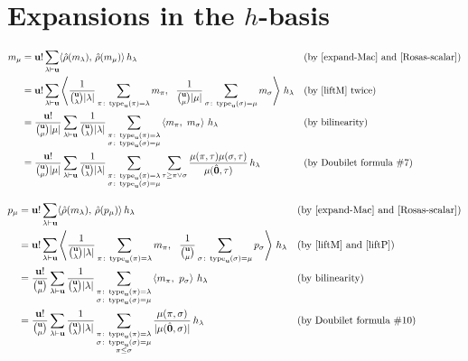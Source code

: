 \section{Expansions in the $h$-basis}

\begin{align*}
m_\mu &=  \mathbf{u}! \sum_{\lambda\vdash\mathbf{u}} \langle \hat\rho(m_\lambda),\,\hat\rho(m_\mu)\rangle\, h_\lambda
	&&\text{(by~\eqref{expand-Mac} and~\eqref{Rosas-scalar})}\\
&= \mathbf{u}! \sum_{\lambda\vdash\mathbf{u}} \left\langle \frac{1}{\binom{\mathbf{u}}{\lambda}|\lambda|} \sum_{\pi\colon \operatorname{type}_{\mathbf{u}}(\pi)=\lambda} m_\pi, \ \ \frac{1}{\binom{\mathbf{u}}{\mu}|\mu|} \sum_{\sigma\colon \operatorname{type}_{\mathbf{u}}(\sigma)=\mu} m_\sigma \right\rangle\, h_\lambda
	&&\text{(by~\eqref{liftM} twice)}\\
&= \frac{\mathbf{u}!}{\binom{\mathbf{u}}{\mu}|\mu|} \sum_{\lambda\vdash\mathbf{u}} \frac{1}{\binom{\mathbf{u}}{\lambda}|\lambda|}
    \sum_{\substack{\pi\colon \operatorname{type}_{\mathbf{u}}(\pi)=\lambda\\ \sigma\colon \operatorname{type}_{\mathbf{u}}(\sigma)=\mu}}
    \left\langle m_\pi,\ m_\sigma \right\rangle\, h_\lambda
	&&\text{(by bilinearity)}\\
&= \frac{\mathbf{u}!}{\binom{\mathbf{u}}{\mu}|\mu|} \sum_{\lambda\vdash\mathbf{u}} \frac{1}{\binom{\mathbf{u}}{\lambda}|\lambda|}
    \sum_{\substack{\pi\colon \operatorname{type}_{\mathbf{u}}(\pi)=\lambda\\ \sigma\colon \operatorname{type}_{\mathbf{u}}(\sigma)=\mu}}
    \sum_{\tau\geq\pi\vee\sigma} \frac{\mu(\pi,\tau)\mu(\sigma,\tau)}{\mu(\hat{\mathbf{0}},\tau)}\, h_\lambda
	&&\text{(by Doubilet formula \#7)}\\
\end{align*}

\begin{align*}
p_\mu &=  \mathbf{u}! \sum_{\lambda\vdash\mathbf{u}} \langle \hat\rho(m_\lambda),\,\hat\rho(p_\mu)\rangle\, h_\lambda
	&&\text{(by~\eqref{expand-Mac} and~\eqref{Rosas-scalar})}\\
&=  \mathbf{u}! \sum_{\lambda\vdash\mathbf{u}} \left\langle \frac{1}{\binom{\mathbf{u}}{\lambda}|\lambda|} \sum_{\pi\colon \operatorname{type}_{\mathbf{u}}(\pi)=\lambda} m_\pi, \ \ \frac{1}{\binom{\mathbf{u}}{\mu}} \sum_{\sigma\colon \operatorname{type}_{\mathbf{u}}(\sigma)=\mu} p_\sigma \right\rangle\, h_\lambda
	&&\text{(by~\eqref{liftM} and~\eqref{liftP})}\\
&= \frac{\mathbf{u}!}{\binom{\mathbf{u}}{\mu}} \sum_{\lambda\vdash\mathbf{u}} \frac{1}{\binom{\mathbf{u}}{\lambda}|\lambda|}
    \sum_{\substack{\pi\colon \operatorname{type}_{\mathbf{u}}(\pi)=\lambda\\ \sigma\colon \operatorname{type}_{\mathbf{u}}(\sigma)=\mu}}
    \left\langle m_\pi,\ p_\sigma \right\rangle\, h_\lambda
	&&\text{(by bilinearity)}\\
&= \frac{\mathbf{u}!}{\binom{\mathbf{u}}{\mu}} \sum_{\lambda\vdash\mathbf{u}} \frac{1}{\binom{\mathbf{u}}{\lambda}|\lambda|}
    \sum_{\substack{\pi\colon \operatorname{type}_{\mathbf{u}}(\pi)=\lambda\\ \sigma\colon \operatorname{type}_{\mathbf{u}}(\sigma)=\mu\\ \pi\leq\sigma}}
    \frac{\mu(\pi,\sigma)}{|\mu(\hat{\mathbf{0}},\sigma)|}\, h_\lambda
	&&\text{(by Doubilet formula \#10)}\\
\end{align*}

